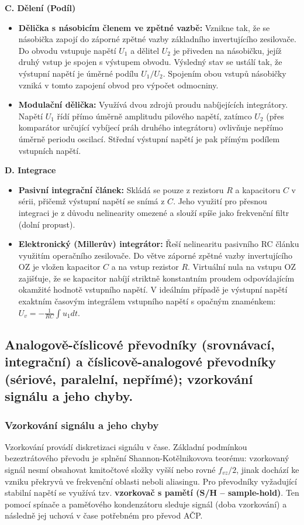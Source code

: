         \textbf{C. Dělení (Podíl)}
        
        \begin{itemize}
            \item \textbf{Dělička s násobicím členem ve zpětné vazbě:} Vznikne tak, že se násobička zapojí do záporné zpětné vazby základního invertujícího zesilovače. Do obvodu vstupuje napětí $U_1$ a dělitel $U_2$ je přiveden na násobičku, jejíž druhý vstup je spojen s výstupem obvodu. Výsledný stav se ustálí tak, že výstupní napětí je úměrné podílu $U_1/U_2$. Spojením obou vstupů násobičky vzniká v tomto zapojení obvod pro výpočet odmocniny.
            \item \textbf{Modulační dělička:} Využívá dvou zdrojů proudu nabíjejících integrátory. Napětí $U_1$ řídí přímo úměrně amplitudu pilového napětí, zatímco $U_2$ (přes komparátor určující vybíjecí práh druhého integrátoru) ovlivňuje nepřímo úměrně periodu oscilací. Střední výstupní napětí je pak přímým podílem vstupních napětí.
        \end{itemize}
        
        \textbf{D. Integrace}
        
        \begin{itemize}
            \item \textbf{Pasivní integrační článek:} Skládá se pouze z rezistoru $R$ a kapacitoru $C$ v sérii, přičemž výstupní napětí se snímá z $C$. Jeho využití pro přesnou integraci je z důvodu nelinearity omezené a slouží spíše jako frekvenční filtr (dolní propust).
            \item \textbf{Elektronický (Millerův) integrátor:} Řeší nelinearitu pasivního RC článku využitím operačního zesilovače. Do větve záporné zpětné vazby invertujícího OZ je vložen kapacitor $C$ a na vstup rezistor $R$. Virtuální nula na vstupu OZ zajišťuje, že se kapacitor nabíjí striktně konstantním proudem odpovídajícím okamžité hodnotě vstupního napětí. V ideálním případě je výstupní napětí exaktním časovým integrálem vstupního napětí s opačným znaménkem: $U_v = -\frac{1}{RC} \int u_1 dt$.
        \end{itemize}
\subsection{Analogově-číslicové převodníky (srovnávací, integrační) a číslicově-analogové převodníky (sériové, paralelní, nepřímé); vzorkování signálu a jeho chyby.}
    \subsubsection{Vzorkování signálu a jeho chyby}
        Vzorkování provádí diskretizaci signálu v čase. Základní podmínkou bezeztrátového převodu je splnění Shannon-Kotělnikovova teorému: vzorkovaný signál nesmí obsahovat kmitočtové složky vyšší nebo rovné $f_{vz}/2$, jinak dochází ke vzniku překryvů ve frekvenční oblasti neboli aliasingu. Pro převodníky vyžadující stabilní napětí se využívá tzv. \textbf{vzorkovač s pamětí (S/H – sample-hold)}. Ten pomocí spínače a paměťového kondenzátoru sleduje signál (doba vzorkování) a následně jej uchová v čase potřebném pro převod AČP.
        
